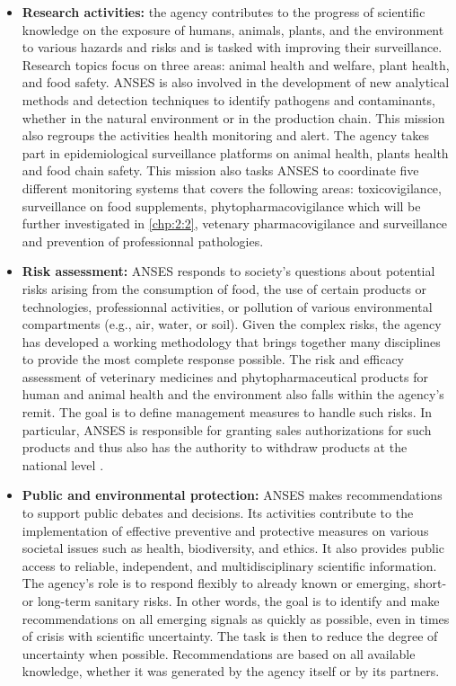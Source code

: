 \begin{itemize}
\item \textbf{Research activities:} the agency contributes to the progress of scientific knowledge on the exposure of humans, animals, plants, and the environment to various hazards and risks and is tasked with improving their surveillance. Research topics focus on three areas: animal health and welfare, plant health, and food safety. ANSES is also involved in the development of new analytical methods and detection techniques to identify pathogens and contaminants, whether in the natural environment or in the production chain. This mission also regroups the activities health monitoring and alert. The agency takes part in epidemiological surveillance platforms on animal health, plants health and food chain safety. This mission also tasks ANSES to coordinate five different monitoring systems that covers the following areas: toxicovigilance, surveillance on food supplements, phytopharmacovigilance which will be further investigated in \ref{chp:2:2}, vetenary pharmacovigilance and surveillance and prevention of professionnal pathologies.      
\item \textbf{Risk assessment:} ANSES responds to society's questions about potential risks arising from the consumption of food, the use of certain products or technologies, professionnal activities, or pollution of various environmental compartments (e.g., air, water, or soil). Given the complex risks, the agency has developed a working methodology that brings together many disciplines to provide the most complete response possible. The risk and efficacy assessment of veterinary medicines and phytopharmaceutical products for human and animal health and the environment also falls within the agency's remit. The goal is to define management measures to handle such risks. In particular, ANSES is responsible for granting sales authorizations for such products and thus also has the authority to withdraw products at the national level \cite{ansesdec}. 
\item \textbf{Public and environmental protection:} ANSES makes recommendations to support public debates and decisions. Its activities contribute to the implementation of effective preventive and protective measures on various societal issues such as health, biodiversity, and ethics. It also provides public access to reliable, independent, and multidisciplinary scientific information. The agency's role is to respond flexibly to already known or emerging, short- or long-term sanitary risks. In other words, the goal is to identify and make recommendations on all emerging signals as quickly as possible, even in times of crisis with scientific uncertainty. The task is then to reduce the degree of uncertainty when possible. Recommendations are based on all available knowledge, whether it was generated by the agency itself or by its partners. 
\end{itemize}

